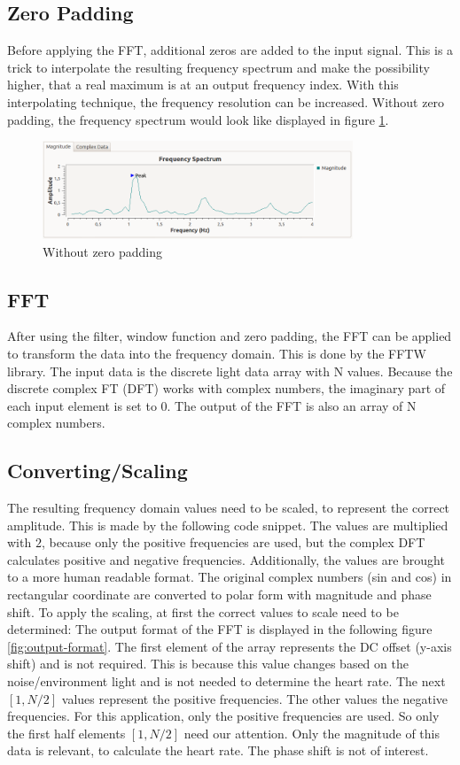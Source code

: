 \documentclass[notitlepage]{scrreprt}
\begin{document}
\subsection{Zero Padding}
\label{subsec:zp}
Before applying the FFT, additional zeros are added to the input signal. This is a trick to interpolate the resulting frequency spectrum and make the possibility higher, that a real maximum is at an output frequency index. With this interpolating technique, the frequency resolution can be increased. Without zero padding, the frequency spectrum would look like displayed in figure \ref{fig:without-zp}.

\begin{figure}[H]
	\centering
	\includegraphics[width=350px]{images/noZeroPaddingAndWithEverythingElse.png}
	\caption{Without zero padding}
	\label{fig:without-zp}
\end{figure}

\subsection{FFT}
After using the filter, window function and zero padding, the FFT can be applied  to transform the data into the frequency domain. This is done by the FFTW library. The input data is the discrete light data array with N values. Because the discrete complex FT (DFT) works with complex numbers, the imaginary part of each input element is set to 0. The output of the FFT is also an array of N complex numbers.

\subsection{Converting/Scaling}
The resulting frequency domain values need to be scaled, to represent the correct amplitude. This is made by the following code snippet. The values are multiplied with $2$, because only the positive frequencies are used, but the complex DFT calculates positive and negative frequencies. Additionally, the values are brought to a more human readable format. The original complex numbers (sin and cos) in rectangular coordinate are converted to polar form with magnitude and phase shift. To apply the scaling, at first the correct values to scale need to be determined: The output format of the FFT is displayed in the following figure \ref{fig:output-format}. The first element of the array represents the DC offset (y-axis shift) and is not required. This is because this value changes based on the noise/environment light and is not needed to determine the heart rate. The next $[1, N/2]$ values represent the positive frequencies. The other values the negative frequencies. For this application, only the positive frequencies are used. So only the first half elements $[1, N/2]$ need our attention. Only the magnitude of this data is relevant, to calculate the heart rate. The phase shift is not of interest.
\end{document}
